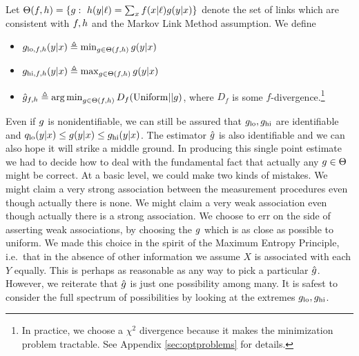 Let $\Theta(\plx,\ply)=\{\pxy:\ \ply(y|\ell) = \sum_x \plx(x|\ell)\pxy(y|x)\}$ denote the set of links which are consistent with $f,h$ and the Markov Link Method assumption.  We define
\begin{itemize}
    \item $g_{\mathrm{lo},f,h}(y|x) \triangleq \min_{g\in \Theta(f,h)} g(y|x)$
    \item $g_{\mathrm{hi},f,h}(y|x)\triangleq \max_{g\in \Theta(f,h)} g(y|x)$ 
    \item $\hat {g}_{f,h} \triangleq \operatorname*{arg\,min}_{g\in \Theta(f,h)} D_{f}(\mathrm{Uniform}||g)$, where $D_f$ is some $f$-divergence.\footnote{In practice, we choose a $\chi^2$ divergence because it makes the minimization problem tractable.  See Appendix \ref{sec:optproblems} for details.}
\end{itemize}
Even if $g$ is nonidentifiable, we can still be assured that $g_{\mathrm{lo}}, g_{\mathrm{hi}}$ are identifiable and $q_{\mathrm{lo}}(y|x) \leq g(y|x) \leq g_{\mathrm{hi}}(y|x)$.  The estimator $\hat {g}$ is also identifiable and we can also hope it will strike a middle ground.  In producing this single point estimate we had to decide how to deal with the fundamental fact that actually any $g \in \Theta$ might be correct.  At a basic level, we could make two kinds of mistakes.  We might claim a very strong association between the measurement procedures even though actually there is none.  We might claim a very weak association even though actually there is a strong association.  We choose to err on the side of asserting weak associations, by choosing the $g$ which is as close as possible to uniform.  We made this choice in the spirit of the Maximum Entropy Principle, i.e.\ that in the absence of other information we assume $X$ is associated with each $Y$ equally.  This is perhaps as reasonable as any way to pick a particular $\hat {g}$.  However, we reiterate that $\hat {g}$ is just one possibility among many.  It is safest to consider the full spectrum of possibilities by looking at the extremes $g_{\mathrm{lo}}, g_{\mathrm{hi}}$.

